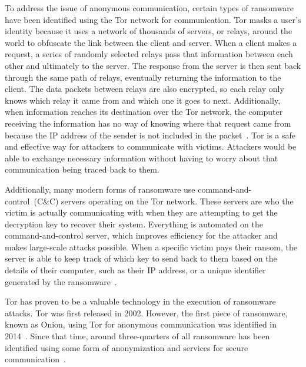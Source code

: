 \documentclass{IEEEtran}
\begin{document}
To address the issue of anonymous communication, certain types of ransomware have been identified using the Tor network for communication. Tor masks a user's identity because it uses a network of thousands of servers, or relays, around the world to obfuscate the link between the client and server. When a client makes a request, a series of randomly selected relays pass that information between each other and ultimately to the server. The response from the server is then sent back through the same path of relays, eventually returning the information to the client. The data packets between relays are also encrypted, so each relay only knows which relay it came from and which one it goes to next. Additionally, when information reaches its destination over the Tor network, the computer receiving the information has no way of knowing where that request came from because the IP address of the sender is not included in the packet~\cite{RN39}. Tor is a safe and effective way for attackers to communicate with victims. Attackers would be able to exchange necessary information without having to worry about that communication being traced back to them.
 
Additionally, many modern forms of ransomware use command-and-control~(C\&C) servers operating on the Tor network. These servers are who the victim is actually communicating with when they are attempting to get the decryption key to recover their system. Everything is automated on the command-and-control server, which improves efficiency for the attacker and makes large-scale attacks possible. When a specific victim pays their ransom, the server is able to keep track of which key to send back to them based on the details of their computer, such as their IP address, or a unique identifier generated by the ransomware~\cite{RN33}.

Tor has proven to be a valuable technology in the execution of ransomware attacks. Tor was first released in 2002. However, the first piece of ransomware, known as Onion, using Tor for anonymous communication was identified in 2014~\cite{RN39}\cite{RN37}. Since that time, around three-quarters of all ransomware has been identified using some form of anonymization and services for secure communication~\cite{RN33}.
\end{document}

